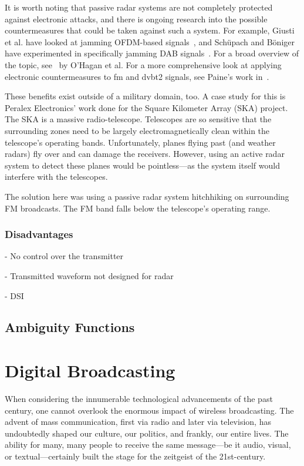 \documentclass[class=report,11pt,crop=false]{standalone}
\begin{document}
\cite{o2009passive}

It is worth noting that passive radar systems are not completely protected against electronic attacks, and there is ongoing research into the possible countermeasures that could be taken against such a system. For example, Giusti et al. have looked at jamming OFDM-based signals~\cite{Giusti2018}, and Sch\"upach and B\"oniger have experimented in specifically jamming DAB signals~\cite{schupbach2016}. For a broad overview of the topic, see~\cite{OHagan2019} by O'Hagan et al. For a more comprehensive look at applying electronic countermeasures to \gls{fm} and \gls{dvbt2} signals, see Paine's work in~\cite{painePHD2019}.

These benefits exist outside of a military domain, too. A case study for this is Peralex Electronics' work done for the Square Kilometer Array (SKA) project. The SKA is a massive radio-telescope. Telescopes are so sensitive that the surrounding zones need to be largely electromagnetically clean within the telescope's operating bands. Unfortunately, planes flying past (and weather radars) fly over and can damage the receivers. However, using an active radar system to detect these planes would be pointless---as the system itself would interfere with the telescopes.

The solution here was using a passive radar system hitchhiking on surrounding FM broadcasts. The FM band falls below the telescope's operating range.

\subsubsection{Disadvantages}

- No control over the transmitter

- Transmitted waveform not designed for radar

- DSI

\subsection{Ambiguity Functions}

\section{Digital Broadcasting}
When considering the innumerable technological advancements of the past century, one cannot overlook the enormous impact of wireless broadcasting. The advent of mass communication, first via radio and later via television, has undoubtedly shaped our culture, our politics, and frankly, our entire lives. The ability for many, many people to receive the same message---be it audio, visual, or textual---certainly built the stage for the zeitgeist of the 21st-century.
\end{document}
